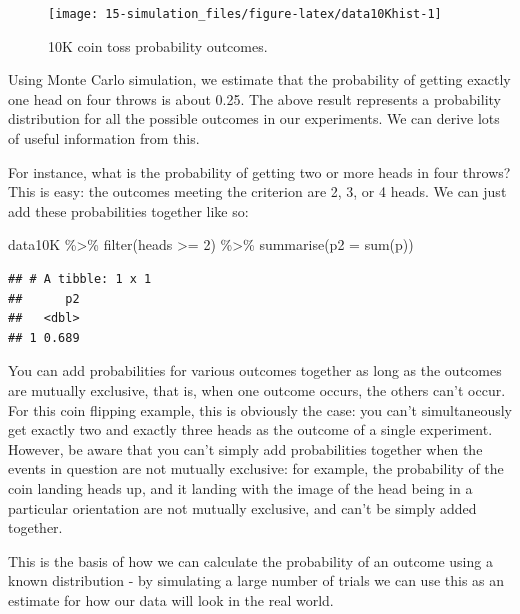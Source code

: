 \documentclass[
  oneside]{book}
\newenvironment{Shaded}{\begin{snugshade}}{\end{snugshade}}
\newcommand{\AttributeTok}[1]{\textcolor[rgb]{0.77,0.63,0.00}{#1}}
\newcommand{\DecValTok}[1]{\textcolor[rgb]{0.00,0.00,0.81}{#1}}
\newcommand{\FunctionTok}[1]{\textcolor[rgb]{0.00,0.00,0.00}{#1}}
\newcommand{\NormalTok}[1]{#1}
\newcommand{\SpecialCharTok}[1]{\textcolor[rgb]{0.00,0.00,0.00}{#1}}
\begin{document}
\begin{figure}

{\centering \texttt{[image: 15-simulation\_files/figure-latex/data10Khist-1]} 

}

\caption{10K coin toss probability outcomes.}\label{fig:data10Khist}
\end{figure}

Using Monte Carlo simulation, we estimate that the probability of getting exactly one head on four throws is about 0.25. The above result represents a probability distribution for all the possible outcomes in our experiments. We can derive lots of useful information from this.

For instance, what is the probability of getting two or more heads in four throws? This is easy: the outcomes meeting the criterion are 2, 3, or 4 heads. We can just add these probabilities together like so:

\begin{Shaded}
\begin{Highlighting}[]
\NormalTok{data10K }\SpecialCharTok{\%\textgreater{}\%}
  \FunctionTok{filter}\NormalTok{(heads }\SpecialCharTok{\textgreater{}=} \DecValTok{2}\NormalTok{) }\SpecialCharTok{\%\textgreater{}\%}
  \FunctionTok{summarise}\NormalTok{(}\AttributeTok{p2 =} \FunctionTok{sum}\NormalTok{(p))}
\end{Highlighting}
\end{Shaded}

\begin{verbatim}
## # A tibble: 1 x 1
##      p2
##   <dbl>
## 1 0.689
\end{verbatim}

You can add probabilities for various outcomes together as long as the outcomes are mutually exclusive, that is, when one outcome occurs, the others can't occur. For this coin flipping example, this is obviously the case: you can't simultaneously get exactly two and exactly three heads as the outcome of a single experiment. However, be aware that you can't simply add probabilities together when the events in question are not mutually exclusive: for example, the probability of the coin landing heads up, and it landing with the image of the head being in a particular orientation are not mutually exclusive, and can't be simply added together.

This is the basis of how we can calculate the probability of an outcome using a known distribution - by simulating a large number of trials we can use this as an estimate for how our data will look in the real world.
\end{document}
